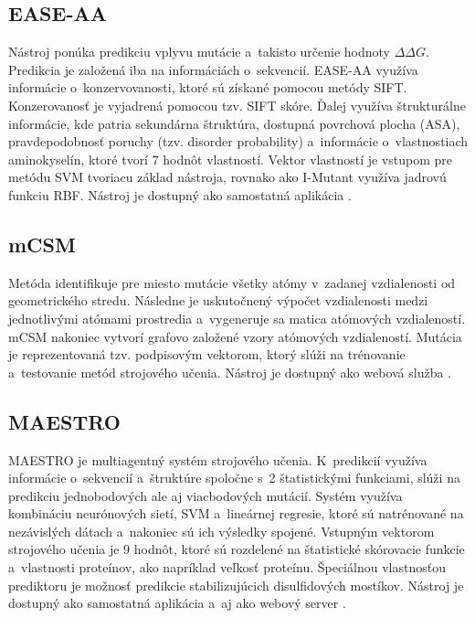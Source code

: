 \subsection{EASE-AA}

Nástroj ponúka predikciu vplyvu mutácie a~takisto určenie hodnoty $\Delta\Delta G$. Predikcia je založená iba na informáciách o~sekvencií. EASE-AA využíva informácie o~konzervovanosti, ktoré sú získané pomocou metódy SIFT. Konzerovanosť je vyjadrená pomocou tzv. SIFT skóre. Ďalej využíva štrukturálne informácie, kde patria sekundárna štruktúra, dostupná povrchová plocha (ASA), pravdepodobnosť poruchy (tzv. disorder probability) a~informácie o~vlastnostiach aminokyselín, ktoré tvorí 7 hodnôt vlastností. Vektor vlastností je vstupom pre metódu SVM tvoriacu základ nástroja, rovnako ako I-Mutant využíva jadrovú funkciu RBF. Nástroj je dostupný ako samostatná aplikácia \cite{ease}.
   
\subsection{mCSM}

Metóda identifikuje pre miesto mutácie všetky atómy v~zadanej vzdialenosti od geometrického stredu. Následne je uskutočnený výpočet vzdialenosti medzi jednotlivými atómami prostredia a~vygeneruje sa matica atómových vzdialeností. mCSM nakoniec vytvorí grafovo založené vzory atómových vzdialeností. Mutácia je reprezentovaná tzv. podpisovým vektorom, ktorý slúži na trénovanie a~testovanie metód strojového učenia. Nástroj je dostupný ako webová služba \cite{mcsm}.

\subsection{MAESTRO}

MAESTRO je multiagentný systém strojového učenia. K~predikcií využíva informácie o~sekvencií a~štruktúre spoločne s~2 štatistickými funkciami, slúži na predikciu jednobodových ale aj viacbodových mutácií. Systém využíva kombináciu neurónových sietí, SVM a~lineárnej regresie, ktoré sú natrénované na nezávislých dátach a~nakoniec sú ich výsledky spojené. Vstupným vektorom strojového učenia je 9 hodnôt, ktoré sú rozdelené na štatistické skórovacie funkcie a~vlastnosti proteínov, ako napríklad veľkosť proteínu. Špeciálnou vlastnosťou prediktoru je možnosť predikcie stabilizujúcich disulfidových mostíkov. Nástroj je dostupný ako samostatná aplikácia a~aj ako webový server \cite{maestro}.


